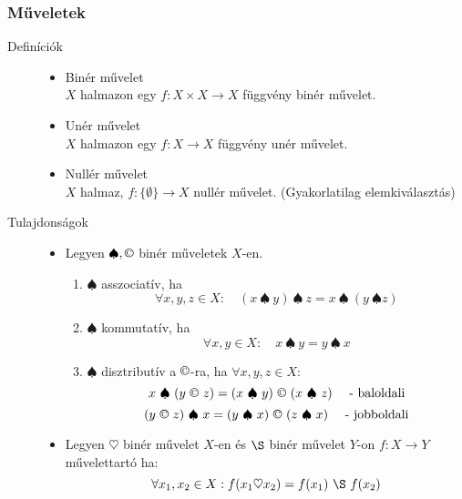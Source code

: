 \documentclass[margin=0px]{article}
\begin{document}
\subsubsection{Műveletek}
\begin{description}
    \item[Definíciók] \hfill
        \begin{itemize}
            \item Binér művelet \\
                  $X$ halmazon egy $f : X \times X \rightarrow X$ függvény binér művelet.
            \item Unér művelet \\
                  $X$ halmazon egy $f : X \rightarrow X$ függvény unér művelet.
            \item Nullér művelet \\
                  $X$ halmaz, $f : \{\emptyset \} \rightarrow X $ nullér művelet. (Gyakorlatilag elemkiválasztás)
        \end{itemize}
    \item[Tulajdonságok] \hfill
        \begin{itemize}
            \item Legyen $\spadesuit, \copyright$ binér műveletek $X$-en.
                  \begin{enumerate}
                      \item $\spadesuit$ asszociatív, ha
                            \[ \forall x,y,z \in X : \quad (x \ \spadesuit \ y ) \ \spadesuit \ z = x \  \spadesuit \  (y \ \spadesuit z) \]

                      \item $\spadesuit$ kommutatív, ha
                            \[ \forall x,y \in X : \quad x \ \spadesuit \ y = y \  \spadesuit \  x \]

                      \item $\spadesuit$ disztributív a $\copyright$-ra, ha $\forall x,y,z \in X$:
                            \[ x \  \spadesuit \  (y \ \copyright \ z) = (x \  \spadesuit \ y) \ \copyright \ (x \ \spadesuit \ z) \quad \textrm{ - baloldali} \]
                            \[ (y \ \copyright \ z) \  \spadesuit \ x = (y \  \spadesuit \ x) \ \copyright \ (z \ \spadesuit \ x) \quad \textrm{ - jobboldali} \]
                  \end{enumerate}

            \item Legyen $\heartsuit$ binér művelet $X$-en és $\S$ binér művelet $Y$-on
                  $f : X \rightarrow Y$ művelettartó ha:
                  \[ \forall x_1,x_2 \in X:  f(x_1 \heartsuit x_2) = f(x_1) \ \S \ f(x_2) \]
        \end{itemize}
\end{description}
\end{document}
